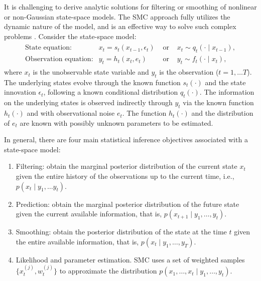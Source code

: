 It is challenging to derive analytic solutions for filtering or smoothing of
nonlinear or non-Gaussian state-space models.  The SMC approach fully utilizes the dynamic nature of the model, and is an effective way to solve such complex problems \citep{tsay2018}. Consider the state-space model:
\begin{align*}
\begin{array}{lccc}
\mbox{State equation:}	&x_t=s_t(x_{t-1},\epsilon_t) &\mbox{ or } &x_t \sim q_t(\cdot \mid x_{t-1}),\\
\mbox{Observation equation:}&y_t=h_t(x_t, e_t) &\mbox{ or } & y_t\sim f_t(\cdot \mid x_t),
\end{array}
\end{align*}
where $x_t$ is the unobservable state variable and $y_t$ is the observation ($t=1,\ldots T$).
The underlying states evolve through the known function $s_t(\cdot)$ and the state innovation
 $\epsilon_t$, following a known conditional distribution $q_t(\cdot)$. The information on the underlying states is observed indirectly through $y_t$ via the known function $h_t(\cdot)$ and with
 observational noise $e_t$. The function $h_t(\cdot)$ and the distribution of $e_t$ are known with
 possibly unknown parameters to be estimated.

In general, there are four main statistical inference objectives associated with a state-space model:
\begin{enumerate}
\item Filtering: obtain the marginal posterior distribution of the current state $x_t$ given the entire history of the observations up to the current time, i.e., $p(x_t \mid y_1, \ldots y_t)$.
\item Prediction: obtain the marginal posterior distribution of the future state given the
current available information,  that is,  $p(x_{t+1}\mid y_1,\ldots, y_t)$.
\item Smoothing: obtain the posterior distribution of the state at the time $t$ given the entire available information, that is, $p(x_{t} \mid y_1,\ldots, y_T)$.
\item Likelihood and parameter estimation. SMC uses a set of weighted samples $\{x_t^{(j)},w_t^{(j)}\}$ to approximate the distribution $p(x_1,\ldots, x_t \mid y_1,\ldots, y_t)$.
\end{enumerate}

